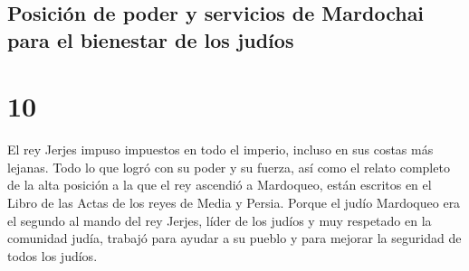 \hypertarget{posiciuxf3n-de-poder-y-servicios-de-mardochai-para-el-bienestar-de-los-juduxedos}{%
\subsection{Posición de poder y servicios de Mardochai para el bienestar
de los
judíos}\label{posiciuxf3n-de-poder-y-servicios-de-mardochai-para-el-bienestar-de-los-juduxedos}}

\hypertarget{section-9}{%
\section{10}\label{section-9}}

 El rey Jerjes impuso impuestos en todo el imperio,
incluso en sus costas más lejanas.  Todo lo que logró con
su poder y su fuerza, así como el relato completo de la alta posición a
la que el rey ascendió a Mardoqueo, están escritos en el Libro de las
Actas de los reyes de Media y Persia.  Porque el judío
Mardoqueo era el segundo al mando del rey Jerjes, líder de los judíos y
muy respetado en la comunidad judía, trabajó para ayudar a su pueblo y
para mejorar la seguridad de todos los judíos.
